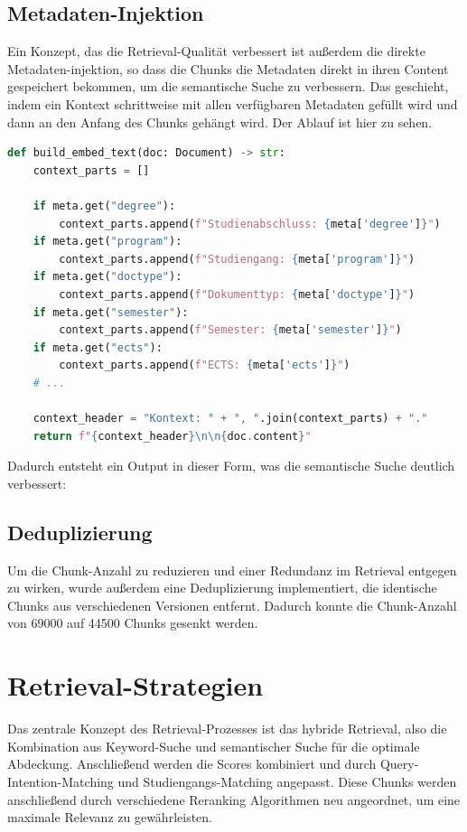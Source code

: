 \subsection{Metadaten-Injektion}
Ein Konzept, das die Retrieval-Qualität verbessert ist außerdem die direkte Metadaten-injektion, so dass die Chunks die Metadaten direkt in ihren Content gespeichert bekommen, um die semantische Suche zu verbessern. Das geschieht, indem ein Kontext schrittweise mit allen verfügbaren Metadaten gefüllt wird und dann an den Anfang des Chunks gehängt wird. Der Ablauf ist hier zu sehen.
\begin{lstlisting}[language=Python, caption={Metadaten Injektion}]
def build_embed_text(doc: Document) -> str:
    context_parts = []
    
    if meta.get("degree"):
        context_parts.append(f"Studienabschluss: {meta['degree']}")
    if meta.get("program"):
        context_parts.append(f"Studiengang: {meta['program']}")
    if meta.get("doctype"):
        context_parts.append(f"Dokumenttyp: {meta['doctype']}")
    if meta.get("semester"):
        context_parts.append(f"Semester: {meta['semester']}")
    if meta.get("ects"):
        context_parts.append(f"ECTS: {meta['ects']}")
    # ...
    
    context_header = "Kontext: " + ", ".join(context_parts) + "."
    return f"{context_header}\n\n{doc.content}"
\end{lstlisting}

Dadurch entsteht ein Output in dieser Form, was die semantische Suche deutlich verbessert:

\subsection{Deduplizierung}
Um die Chunk-Anzahl zu reduzieren und einer Redundanz im Retrieval entgegen zu wirken, wurde außerdem eine Deduplizierung implementiert, die identische Chunks aus verschiedenen Versionen entfernt. Dadurch konnte die Chunk-Anzahl von 69000 auf 44500 Chunks gesenkt werden.

\section{Retrieval-Strategien}
Das zentrale Konzept des Retrieval-Prozesses ist das hybride Retrieval, also die Kombination aus Keyword-Suche und semantischer Suche für die optimale Abdeckung. Anschließend werden die Scores kombiniert und durch Query-Intention-Matching und Studiengangs-Matching angepasst. Diese Chunks werden anschließend durch verschiedene Reranking Algorithmen neu angeordnet, um eine maximale Relevanz zu gewährleisten.
